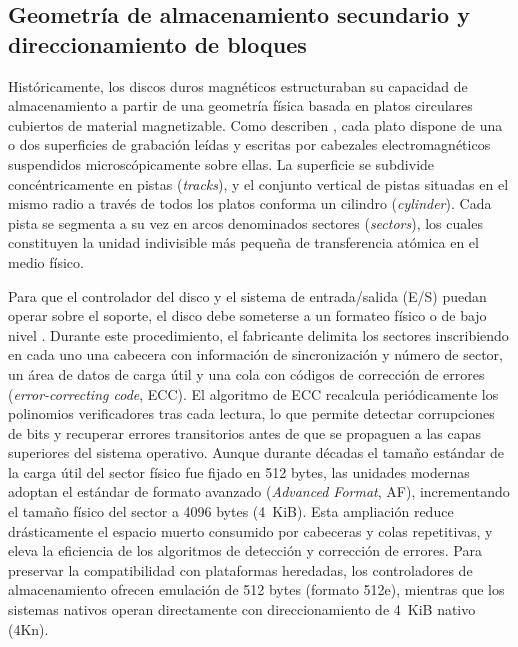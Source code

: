 \documentclass[12pt]{article}
\begin{document}
\subsection{Geometría de almacenamiento secundario y direccionamiento de bloques}
\label{sec:geometriaAlmacenamiento}

Históricamente, los discos duros magnéticos estructuraban su capacidad de almacenamiento a partir de una geometría física basada en platos circulares cubiertos de material magnetizable. Como describen \textcite[\S 11.5, pp.\ 521--523]{stallings2018operating}, cada plato dispone de una o dos superficies de grabación leídas y escritas por cabezales electromagnéticos suspendidos microscópicamente sobre ellas. La superficie se subdivide concéntricamente en pistas (\textit{tracks}), y el conjunto vertical de pistas situadas en el mismo radio a través de todos los platos conforma un cilindro (\textit{cylinder}). Cada pista se segmenta a su vez en arcos denominados sectores (\textit{sectors}), los cuales constituyen la unidad indivisible más pequeña de transferencia atómica en el medio físico.

Para que el controlador del disco y el sistema de entrada/salida (E/S) puedan operar sobre el soporte, el disco debe someterse a un formateo físico o de bajo nivel \parencite[\S 12.5.1, pp.\ 418--419]{silberschatz2006fundamentos}. Durante este procedimiento, el fabricante delimita los sectores inscribiendo en cada uno una cabecera con información de sincronización y número de sector, un área de datos de carga útil y una cola con códigos de corrección de errores (\textit{error-correcting code}, ECC). El algoritmo de ECC recalcula periódicamente los polinomios verificadores tras cada lectura, lo que permite detectar corrupciones de bits y recuperar errores transitorios antes de que se propaguen a las capas superiores del sistema operativo. Aunque durante décadas el tamaño estándar de la carga útil del sector físico fue fijado en 512 bytes, las unidades modernas adoptan el estándar de formato avanzado (\textit{Advanced Format}, AF), incrementando el tamaño físico del sector a 4096 bytes (4~KiB). Esta ampliación reduce drásticamente el espacio muerto consumido por cabeceras y colas repetitivas, y eleva la eficiencia de los algoritmos de detección y corrección de errores. Para preservar la compatibilidad con plataformas heredadas, los controladores de almacenamiento ofrecen emulación de 512 bytes (formato 512e), mientras que los sistemas nativos operan directamente con direccionamiento de 4~KiB nativo (4Kn).
\end{document}
